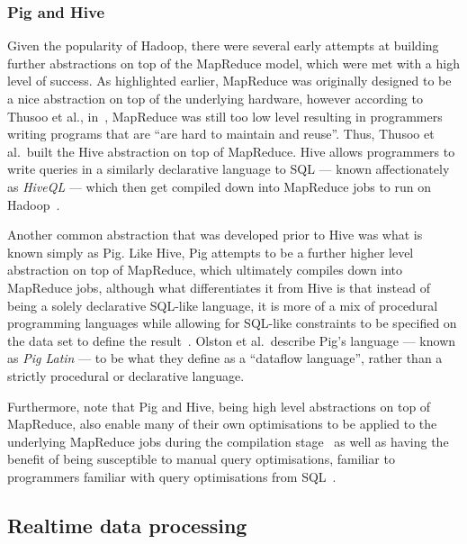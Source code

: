 

\subsubsection{Pig and Hive} %
\label{ssub:pig_and_hive}

Given the popularity of Hadoop, there were several early attempts at building further abstractions on top of the
MapReduce model, which were met with a high level of success. As highlighted earlier, MapReduce was originally designed
to be a nice abstraction on top of the underlying hardware, however according to Thusoo et al., in~\cite{thusoo2009hive},
MapReduce was still too low level resulting in programmers writing programs that are ``are hard to maintain and reuse''.
Thus, Thusoo et al.\ built the Hive abstraction on top of MapReduce. Hive allows programmers to write queries in a
similarly declarative language to SQL --- known affectionately as \emph{HiveQL} --- which then get compiled down into
MapReduce jobs to run on Hadoop~\cite{thusoo2010hive}.

Another common abstraction that was developed prior to Hive was what is known simply as Pig. Like Hive, Pig attempts to
be a further higher level abstraction on top of MapReduce, which ultimately compiles down into MapReduce jobs, although
what differentiates it from Hive is that instead of being a solely declarative SQL-like language, it is more of a mix of
procedural programming languages while allowing for SQL-like constraints to be specified on the data set to define the
result~\cite{olston2008pig}. Olston et al.\ describe Pig's language --- known as \emph{Pig Latin} --- to be what they
define as a ``dataflow language'', rather than a strictly procedural or declarative language.

Furthermore, note that Pig and Hive, being high level abstractions on top of MapReduce, also enable many of their own
optimisations to be applied to the underlying MapReduce jobs during the compilation
stage~\cite{gates2009building,thusoo2010hive} as well as having the benefit of being susceptible to manual query
optimisations, familiar to programmers familiar with query optimisations from SQL~\cite{gruenheid2011query}.




\subsection{Realtime data processing} %
\label{sub:realtime_data_processing}

